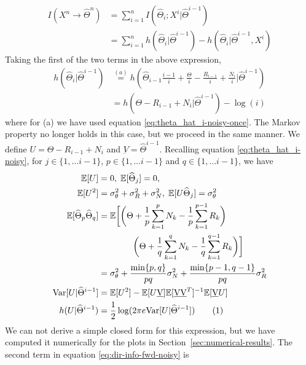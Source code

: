 \documentclass[conference]{IEEEtran}
\newcommand\numberthis{\stepcounter{equation}\tag{\theequation}}
\begin{document}
\begin{align*}
	I(X^n \rightarrow \widehat\Theta^n) &= \sum_{i=1}^n{I(\widehat\Theta_i ; X^i | \widehat\Theta^{i-1})} \\
									 &= \sum_{i=1}^n{h(\widehat\Theta_i | \widehat\Theta^{i-1}) - h(\widehat\Theta_i | \widehat\Theta^{i-1}, X^i)}
\end{align*}
Taking the first of the two terms in the above expression,
\begin{align*}
	h(\widehat\Theta_i | \widehat\Theta^{i-1}) &\overset{(a)}{=} h(\widehat\Theta_{i-1} \frac{i-1}{i} + \frac{\Theta}{i} - \frac{R_{i-1}}{i} + \frac{N_i}{i} | \widehat\Theta^{i-1}) \\
											   &= h(\Theta - R_{i-1} + N_i | \widehat\Theta^{i-1}) -\log(i)
\end{align*}
where for (a) we have used equation \eqref{eq:theta_hat_i-noisy-once}. The Markov property no longer holds in this case, but we proceed in the same manner. We define $U = \Theta - R_{i-1} + N_i$ and $\underbar{V} = \widehat\Theta^{i-1}$. Recalling equation \eqref{eq:theta_hat_i-noisy}, for $j \in \{1, \ldots i-1\}$, $p \in \{1, \ldots i-1\}$ and $q \in \{1, \ldots i-1\}$, we have
\begin{align*}
	\mathbb{E}[U] &= 0,\;	\mathbb{E}[\widehat\Theta_j] = 0,\;\\	\mathbb{E}[U^2] &= \sigma_\theta^2 + \sigma_R^2 + \sigma_N^2,\;	\mathbb{E}[U \widehat\Theta_j] = \sigma_\theta^2 \\
	\mathbb{E}[\widehat\Theta_p \widehat\Theta_q] &= \mathbb{E} \bigg[ \bigg( \Theta + \frac{1}{p} \sum_{k=1}^p N_k - \frac{1}{p} \sum_{k=1}^{p-1} R_k \bigg)\\
												  & \qquad \qquad \bigg( \Theta + \frac{1}{q} \sum_{k=1}^q N_k - \frac{1}{q} \sum_{k=1}^{q-1} R_k \bigg) \bigg] \\
												  &= \sigma_\theta^2 + \frac{\min\{p, q\}}{pq} \sigma_N^2 + \frac{\min\{p-1, q-1\}}{pq} \sigma_R^2 \\
	\text{Var}[U|\widehat\Theta^{i-1}] &= \mathbb{E}[U^2] - \mathbb{E}[U \underbar{V}] \mathbb{E}[\underbar{V} \underbar{V}^T]^{-1} \mathbb{E}[\underbar{V} U] \\
	h(U | \widehat\Theta^{i-1}) &= \frac{1}{2}\log(2 \pi e \text{Var}[U | \widehat\Theta^{i-1}]) \numberthis \label{eq:h_theta_theta-noisy}
\end{align*}
We can not derive a simple closed form for this expression, but we have computed it numerically for the plots in Section~\ref{sec:numerical-results}. The second term in equation \eqref{eq:dir-info-fwd-noisy} is
\end{document}
